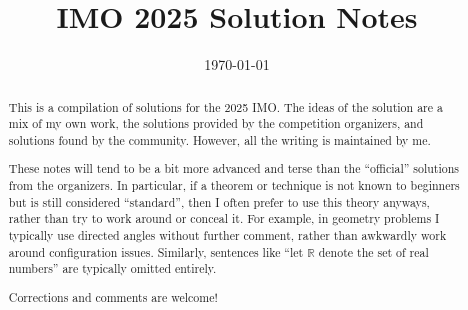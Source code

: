 \documentclass[11pt]{scrartcl}
\title{IMO 2025 Solution Notes}
\date{\today}
\begin{document}
\maketitle

\begin{abstract}
This is a compilation of solutions
for the 2025 IMO.
The ideas of the solution are a mix of my own work,
the solutions provided by the competition organizers,
and solutions found by the community.
However, all the writing is maintained by me.

These notes will tend to be a bit more advanced and terse than the ``official''
solutions from the organizers.
In particular, if a theorem or technique is not known to beginners
but is still considered ``standard'', then I often prefer to
use this theory anyways, rather than try to work around or conceal it.
For example, in geometry problems I typically use directed angles
without further comment, rather than awkwardly work around configuration issues.
Similarly, sentences like ``let $\mathbb{R}$ denote the set of real numbers''
are typically omitted entirely.

Corrections and comments are welcome!
\end{abstract}

\tableofcontents
\newpage

\addtocounter{section}{-1}
\end{document}
